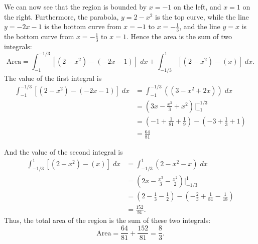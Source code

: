 \documentclass{ximera}
\begin{document}
\begin{example}
We can now see that the region is bounded by $x = -1$ on the left, and  $x = 1$ on the right.
Furthermore, the parabola, $y = 2 - x^2$ is the top curve, while the line $y = -2x-1$ is the bottom curve 
from $x = -1$ to $x = -\frac13$, and the line $y = x$ is the bottom curve from $x = -\frac13$ to $x = 1$.
Hence the area is the sum of two integrals:
\[
\text{Area} = \int_{-1}^{-1/3} \left[(2 - x^2) - (-2x-1)\right] \; dx + \int_{-1/3}^1 \left[(2 - x^2) - (x)\right] \; dx.
\]
The value of the first integral is
\begin{align*}
\int_{-1}^{-1/3} \left[(2 - x^2) - (-2x-1)\right] \; dx &= \int_{-1}^{-1/3} \left((3 - x^2 +2x)\right) \; dx \\
                                                        &= \left(3x - \frac{x^3}{3} + x^2 \right)\bigg|_{-1}^{-1/3} \\
                                                        &= \left(-1 + \tfrac{1}{81} + \tfrac19 \right) - \left(-3 + \tfrac13 + 1 \right) \\
                                                        &= \tfrac{64}{81}
\end{align*}

And the value of the second integral is
\begin{align*}
\int_{-1/3}^{1} \left[(2 - x^2) - (x)\right] \; dx &= \int_{-1/3}^{1} \left(2 - x^2 - x\right) \; dx \\
                                                        &= \left(2x - \frac{x^3}{3} -\frac{x^2}{2} \right)\bigg|_{-1/3}^{1} \\
                                                        &= \left(2 - \tfrac{1}{3} - \tfrac12 \right) - \left(-\tfrac23 + \tfrac{1}{81} -\tfrac{1}{18} \right) \\
                                                        &= \tfrac{152}{81}.
\end{align*}
Thus, the total area of the region is the sum of these two integrals:
\[
\text{Area} = \frac{64}{81} + \frac{152}{81} = \frac{8}{3}.
\]

\begin{center}
\end{center}
\end{example}
\end{document}
